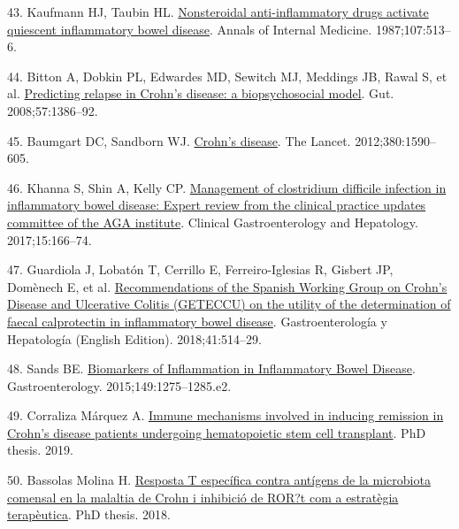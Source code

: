 \documentclass[
  12pt,
  a4paper,
  twoside,
  openright]{book}
\newlength{\cslhangindent}
\newlength{\cslentryspacingunit} %
\newenvironment{CSLReferences}[2] %
 {%
  \setlength{\parindent}{0pt}
  \ifodd #1
  \let\oldpar\par
  \def\par{\hangindent=\cslhangindent\oldpar}
  \fi
  \setlength{\parskip}{#2\cslentryspacingunit}
 }%
 {}
\begin{document}
\begin{CSLReferences}{0}{0}
\leavevmode{}%
43. Kaufmann HJ, Taubin HL. \href{https://doi.org/10.7326/0003-4819-107-4-513}{Nonsteroidal anti-inflammatory drugs activate quiescent inflammatory bowel disease}. Annals of Internal Medicine. 1987;107:513--6.

\leavevmode{}%
44. Bitton A, Dobkin PL, Edwardes MD, Sewitch MJ, Meddings JB, Rawal S, et al. \href{https://doi.org/10.1136/gut.2007.134817}{Predicting relapse in Crohn's disease: a biopsychosocial model}. Gut. 2008;57:1386--92.

\leavevmode{}%
45. Baumgart DC, Sandborn WJ. \href{https://doi.org/10.1016/S0140-6736(12)60026-9}{Crohn's disease}. The Lancet. 2012;380:1590--605.

\leavevmode{}%
46. Khanna S, Shin A, Kelly CP. \href{https://doi.org/10.1016/j.cgh.2016.10.024}{Management of clostridium difficile infection in inflammatory bowel disease: Expert review from the clinical practice updates committee of the AGA institute}. Clinical Gastroenterology and Hepatology. 2017;15:166--74.

\leavevmode{}%
47. Guardiola J, Lobatón T, Cerrillo E, Ferreiro-Iglesias R, Gisbert JP, Domènech E, et al. \href{https://doi.org/10.1016/j.gastre.2018.05.018}{Recommendations of the Spanish Working Group on Crohn's Disease and Ulcerative Colitis (GETECCU) on the utility of the determination of faecal calprotectin in inflammatory bowel disease}. Gastroenterología y Hepatología (English Edition). 2018;41:514--29.

\leavevmode{}%
48. Sands BE. \href{https://doi.org/10.1053/j.gastro.2015.07.003}{Biomarkers of Inflammation in Inflammatory Bowel Disease}. Gastroenterology. 2015;149:1275--1285.e2.

\leavevmode{}%
49. Corraliza Márquez A. \href{http://diposit.ub.edu/dspace/handle/2445/143300}{Immune mechanisms involved in inducing remission in Crohn{'}s disease patients undergoing hematopoietic stem cell transplant}. PhD thesis. 2019.

\leavevmode{}%
50. Bassolas Molina H. \href{http://diposit.ub.edu/dspace/handle/2445/131017}{Resposta T específica contra antígens de la microbiota comensal en la malaltia de Crohn i inhibició de ROR?t com a estratègia terapèutica}. PhD thesis. 2018.


\end{CSLReferences}
\end{document}
